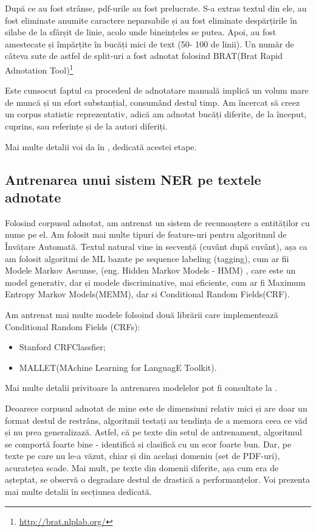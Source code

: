 După ce au fost strânse, pdf-urile au fost prelucrate. S-a extras textul din ele, au fost eliminate anumite caractere neparsabile și au fost eliminate despărțirile în silabe de la sfârșit de linie, acolo unde bineințeles se putea. Apoi, au fost amestecate și împărțite în bucăți mici de text (50- 100 de linii). Un număr de câteva sute de astfel de split-uri a fost adnotat folosind BRAT(Brat Rapid Adnotation Tool)\footnote{\url{http://brat.nlplab.org/}}

Este cunsocut faptul ca procedeul de adnotatare manuală implică un volum mare de muncă și un efort substanțial, consumând destul timp. Am încercat să creez un corpus statistic reprezentativ, adică am adnotat bucăți diferite, de la început, cuprins, sau referințe și de la autori diferiți.

Mai multe detalii voi da în , dedicată acestei etape.

\subsection{Antrenarea unui sistem NER pe textele adnotate}

Folosind corpusul adnotat, am antrenat un sistem de recunoaștere a entităților cu nume pe el. Am folosit mai multe tipuri de feature-uri pentru algoritmul de Învățare Automată. Textul natural vine in secvență (cuvânt după cuvânt), așa ca am folosit algoritmi de ML bazate pe sequence labeling (tagging), cum ar fii Modele Markov Ascunse, (eng. Hidden Markov Models - HMM) , care este un model generativ, dar și modele discriminative, mai eficiente, cum ar fi Maximum Entropy Markov Models(MEMM), dar si Conditional Random Fields(CRF).

Am antrenat mai multe modele folsoind două librării care implementează Conditional Random Fields (CRFs):
\begin{itemize}
\item Stanford CRFClassfier;
\item MALLET(MAchine Learning for LanguagE Toolkit).
\end{itemize}

Mai multe detalii privitoare la antrenarea modelelor pot fi consultate la .


Deoarece corpusul adnotat de mine este de dimensiuni relativ mici și are doar un format destul de restrâns, algoritmii testați au tendința de a memora ceea ce văd și nu prea generalizază. Astfel, că pe texte din setul de antrenament, algoritmul se comportă foarte bine - identifică si clasifică cu un scor foarte bun. Dar, pe texte pe care nu le-a văzut, chiar și din același domeniu (set de PDF-uri), acuratețea scade. Mai mult, pe texte din domenii diferite, așa cum era de așteptat, se observă o degradare destul de drastică a performanțelor. Voi prezenta mai multe detalii în secțiunea dedicată.


